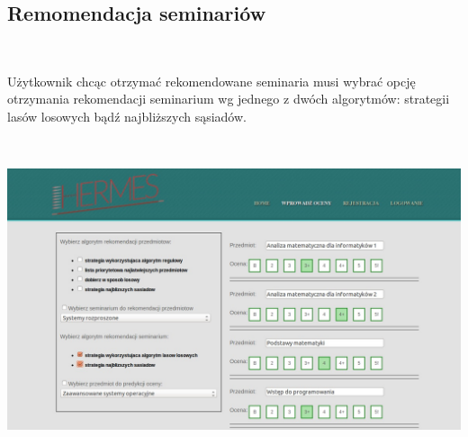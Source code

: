 \documentclass[licencjacka]{pracamgr}
\begin{document}
\subsection{Remomendacja seminariów}
~\\ \indent

Użytkownik chcąc otrzymać rekomendowane seminaria musi wybrać opcję otrzymania rekomendacji seminarium wg jednego z dwóch algorytmów: strategii lasów losowych bądź najbliższych sąsiadów. \par 
~\\
\begin{minipage}{\linewidth}
	\centering
           \includegraphics[scale=0.5]{reksem.jpg}
\end{minipage} \\

\newpage
\end{document}
